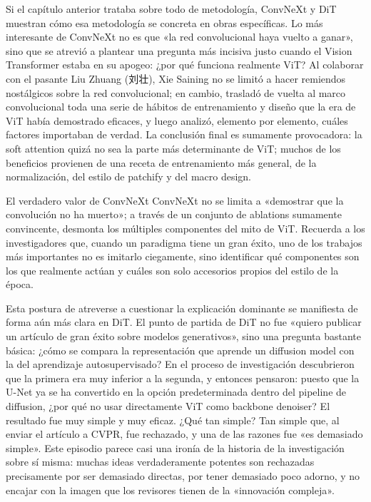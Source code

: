 \documentclass[a4paper,12pt]{article}
\begin{document}
Si el capítulo anterior trataba sobre todo de metodología, ConvNeXt y DiT muestran cómo esa metodología se concreta en obras específicas. Lo más interesante de ConvNeXt no es que «la red convolucional haya vuelto a ganar», sino que se atrevió a plantear una pregunta más incisiva justo cuando el Vision Transformer estaba en su apogeo: ¿por qué funciona realmente ViT? Al colaborar con el pasante Liu Zhuang (刘壮), Xie Saining no se limitó a hacer remiendos nostálgicos sobre la red convolucional; en cambio, trasladó de vuelta al marco convolucional toda una serie de hábitos de entrenamiento y diseño que la era de ViT había demostrado eficaces, y luego analizó, elemento por elemento, cuáles factores importaban de verdad. La conclusión final es sumamente provocadora: la soft attention quizá no sea la parte más determinante de ViT; muchos de los beneficios provienen de una receta de entrenamiento más general, de la normalización, del estilo de patchify y del macro design.

\begin{knowledgebox}{El verdadero valor de ConvNeXt}
ConvNeXt no se limita a «demostrar que la convolución no ha muerto»; a través de un conjunto de ablations sumamente convincente, desmonta los múltiples componentes del mito de ViT. Recuerda a los investigadores que, cuando un paradigma tiene un gran éxito, uno de los trabajos más importantes no es imitarlo ciegamente, sino identificar qué componentes son los que realmente actúan y cuáles son solo accesorios propios del estilo de la época.
\end{knowledgebox}

Esta postura de atreverse a cuestionar la explicación dominante se manifiesta de forma aún más clara en DiT. El punto de partida de DiT no fue «quiero publicar un artículo de gran éxito sobre modelos generativos», sino una pregunta bastante básica: ¿cómo se compara la representación que aprende un diffusion model con la del aprendizaje autosupervisado? En el proceso de investigación descubrieron que la primera era muy inferior a la segunda, y entonces pensaron: puesto que la U-Net ya se ha convertido en la opción predeterminada dentro del pipeline de diffusion, ¿por qué no usar directamente ViT como backbone denoiser? El resultado fue muy simple y muy eficaz. ¿Qué tan simple? Tan simple que, al enviar el artículo a CVPR, fue rechazado, y una de las razones fue «es demasiado simple». Este episodio parece casi una ironía de la historia de la investigación sobre sí misma: muchas ideas verdaderamente potentes son rechazadas precisamente por ser demasiado directas, por tener demasiado poco adorno, y no encajar con la imagen que los revisores tienen de la «innovación compleja».
\end{document}
